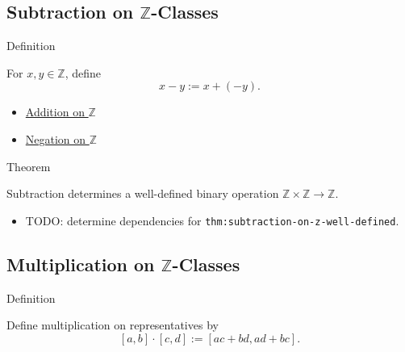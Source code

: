 \subsection*{Subtraction on $\mathbb{Z}$-Classes}

\begin{definitionbox}{Definition}
\begin{definition}
\label{def:subtraction-on-z}
For $x,y\in\mathbb{Z}$, define
\[
x-y:=x+(-y).
\]
\end{definition}
\end{definitionbox}

\begin{dependencies}
\begin{itemize}
  \item \hyperref[def:addition-on-z-classes]{Addition on $\mathbb{Z}$}
  \item \hyperref[def:negation-on-z-classes]{Negation on $\mathbb{Z}$}
\end{itemize}
\end{dependencies}

\begin{theorembox}{Theorem}
\begin{theorem}
\label{thm:subtraction-on-z-well-defined}
Subtraction determines a well-defined binary operation
$\mathbb{Z}\times\mathbb{Z}\to\mathbb{Z}$.
\end{theorem}
\end{theorembox}

\begin{dependencies}
\begin{itemize}
  \item TODO: determine dependencies for \texttt{thm:subtraction-on-z-well-defined}.
\end{itemize}
\end{dependencies}

\subsection*{Multiplication on $\mathbb{Z}$-Classes}

\begin{definitionbox}{Definition}
\begin{definition}
\label{def:multiplication-on-z-classes}
Define multiplication on representatives by
\[
[a,b]\cdot[c,d]:=[ac+bd,ad+bc].
\]
\end{definition}
\end{definitionbox}

